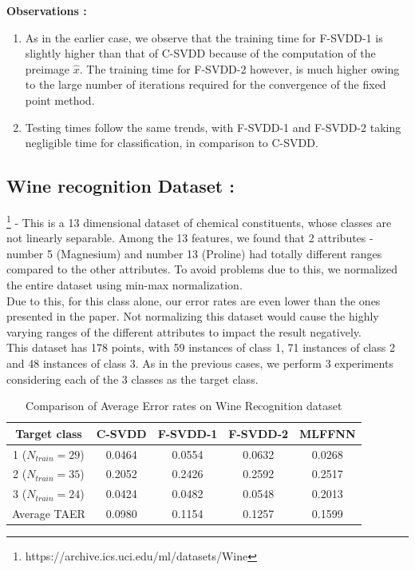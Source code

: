 \documentclass{article} %
\begin{document}
\textbf{Observations :}
\begin{enumerate}
\item As in the earlier case, we observe that the training time for F-SVDD-1 is slightly higher than that of C-SVDD because of the computation of the preimage $\hat{x}$. The training time for F-SVDD-2 however, is much higher owing to the large number of iterations required for the convergence of the fixed point method.
\item Testing times follow the same trends, with F-SVDD-1 and F-SVDD-2 taking negligible time for classification, in comparison to C-SVDD.
\end{enumerate}
\newpage



\subsection{Wine recognition Dataset :}\footnote{https://archive.ics.uci.edu/ml/datasets/Wine}  - This is a 13 dimensional dataset of chemical constituents, whose classes are not linearly separable. Among the 13 features, we found that 2 attributes - number 5 (Magnesium)  and number 13 (Proline) had totally different ranges compared to the other attributes. To avoid problems due to this, we normalized the entire dataset using min-max normalization. 
\\[10pt]
Due to this, for this class alone, our error rates are even lower than the ones presented in the paper. Not normalizing this dataset would cause the highly varying ranges of the different attributes to impact the result negatively.
\\[5pt]
This dataset has 178 points, with 59 instances of class 1, 71 instances of class 2 and 48 instances of class 3. 
As in the previous cases, we perform 3 experiments considering each of the 3 classes as the target class.



\begin{table}[H]
\begin{center}
\caption{Comparison of Average Error rates on Wine Recognition dataset}
\begin{tabular}{|c|c|c|c|c|}
\hline
Target class & C-SVDD & F-SVDD-1 & F-SVDD-2 & MLFFNN \\ \hline
1 ($N_{train} = 29$) & 0.0464   & 0.0554  & 0.0632   & 0.0268\\ \hline
2 ($N_{train} = 35$) &  0.2052  &  0.2426   & 0.2592   & 0.2517 \\ \hline
3 ($N_{train} = 24$) & 0.0424   &  0.0482  &  0.0548 &  0.2013 \\ \hline
Average TAER &  0.0980 & 0.1154 & 0.1257 &  0.1599 \\ \hline

\end{tabular}
\end{center}
\end{table}
\end{document}
